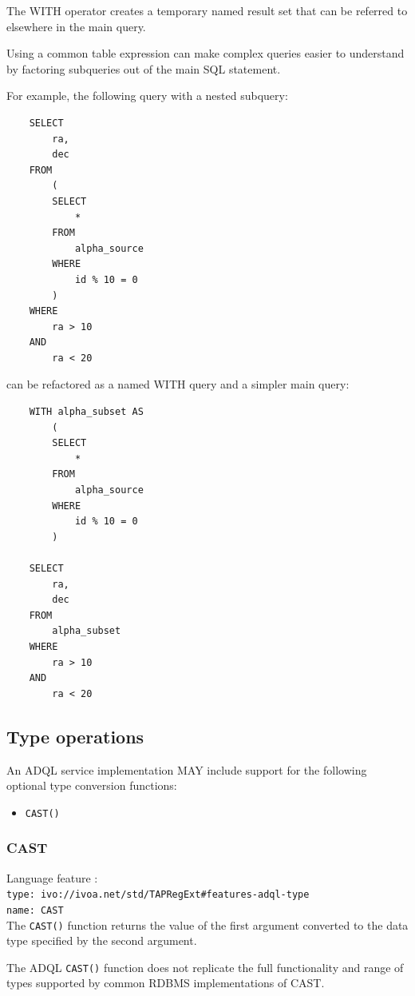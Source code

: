\documentclass[11pt,a4paper]{ivoa}
\begin{document}
The WITH operator creates a temporary named result set that can be referred
to elsewhere in the main query.

Using a common table expression can make complex queries easier to understand
by factoring subqueries out of the main SQL statement.

For example, the following query with a nested subquery: 
\begin{verbatim}
    SELECT
        ra,
        dec
    FROM
        (
        SELECT
            *
        FROM
            alpha_source
        WHERE
            id % 10 = 0
        )
    WHERE
        ra > 10
    AND 
        ra < 20
\end{verbatim}
\noindent
can be refactored as a named WITH query and a simpler main query:
\begin{verbatim}
    WITH alpha_subset AS
        (
        SELECT
            *
        FROM
            alpha_source
        WHERE
            id % 10 = 0
        )

    SELECT
        ra,
        dec
    FROM
        alpha_subset
    WHERE
        ra > 10
    AND 
        ra < 20
\end{verbatim}

\subsection{Type operations}
\label{sec:type}

An ADQL service implementation MAY include support for the following optional
type conversion functions:

\begin{itemize}
    \item \verb:CAST():
\end{itemize}

\subsubsection{CAST}
\label{sec:type.cast}
{\footnotesize Language feature :}\\
{\footnotesize \verb|type: ivo://ivoa.net/std/TAPRegExt#features-adql-type|}\\
{\footnotesize \verb|name: CAST|}\\

The \verb:CAST(): function returns the value of the first argument converted
to the data type specified by the second argument.

The ADQL \verb:CAST(): function does not replicate the full functionality
and range of types supported by common RDBMS implementations of CAST.
\end{document}
